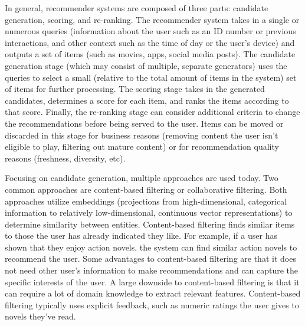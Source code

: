 \documentclass{article}
\begin{document}
In general, recommender systems are composed of three parts: candidate generation, scoring, and re-ranking. The recommender system takes in a single or numerous queries (information about the user such as an ID number or previous interactions, and other context such as the time of day or the user's device) and outputs a set of items (such as movies, apps, social media posts). The candidate generation stage (which may consist of multiple, separate generators) uses the queries to select a small (relative to the total amount of items in the system) set of items for further processing. The scoring stage takes in the generated candidates, determines a score for each item, and ranks the items according to that score. Finally, the re-ranking stage can consider additional criteria to change the recommendations before being served to the user. Items can be moved or discarded in this stage for business reasons (removing content the user isn't eligible to play, filtering out mature content) or for recommendation quality reasons (freshness, diversity, etc).

Focusing on candidate generation, multiple approaches are used today. Two common approaches are content-based filtering or collaborative filtering. Both approaches utilize embeddings (projections from high-dimensional, categorical information to relatively low-dimensional, continuous vector representations) to determine similarity between entities. Content-based filtering finds similar items to those the user has already indicated they like. For example, if a user has shown that they enjoy action novels, the system can find similar action novels to recommend the user. Some advantages to content-based filtering are that it does not need other user’s information to make recommendations and can capture the specific interests of the user. A large downside to content-based filtering is that it can require a lot of domain knowledge to extract relevant features. Content-based filtering typically uses explicit feedback, such as numeric ratings the user gives to novels they've read.
\end{document}
